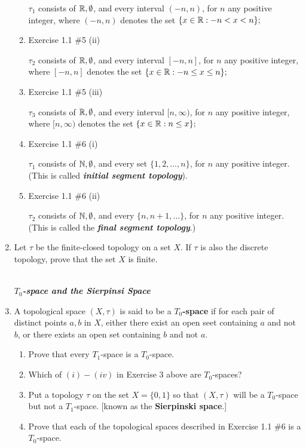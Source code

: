 \documentclass[10pt,a4paper]{report}
\newcommand{\SPECIAL}[1]{\begin{center}
	{\Large \textbf{\textit{\\#1}} }
\end{center}
}
\begin{document}
\begin{enumerate}
\begin{enumerate}[label=(\roman*)]
	$\tau_1$ consists of $\mathbb{R}, \emptyset$, and every interval $(-n,n)$, for $n$ any positive integer, where $(-n,n)$ denotes the set $\{x \in\mathbb{R}:-n<x<n\};$
	
	\item Exercise 1.1 \#5 (ii)
	
	$\tau_2$ consists of $\mathbb{R}, \emptyset$, and every interval $[-n,n]$, for $n$ any positive integer, where $[-n,n]$ denotes the set $\{x \in\mathbb{R}:-n\le x\le n\};$
	
	\item Exercise 1.1 \#5 (iii)
	
	$\tau_3$ consists of $\mathbb{R}, \emptyset$, and every interval $[n,\infty)$, for $n$ any positive integer, where $[n,\infty)$ denotes the set $\{x \in\mathbb{R}:n\le x\};$
	
	\item Exercise 1.1 \#6 (i)
	
	$\tau_1$ consists of $\mathbb{N}, \emptyset$, and every set $\{1,2,\dots,n\}$, for $n$ any positive integer. (This is called \textbf{\textit{initial segment topology}}).
	
	\item Exercise 1.1 \#6 (ii)
	
	$\tau_2$ consists of $\mathbb{N},\emptyset$, and every $\{n, n+1, \dots\}$, for $n$ any positive integer. (This is called the \textbf{\textit{final segment topology}}.)
	
\end{enumerate}

\item Let $\tau$ be the finite-closed topology on a set $X$.  If $\tau$ is also the discrete topology, prove that the set $X$ is finite.

\SPECIAL{$T_0$-space and the Sierpinsi Space}

\item A topological space $(X,\tau)$ is said to be a \textbf{$T_0$-space} if for each pair of distinct points $a,b$ in $X$, either there exist an open seet containing $a$ and not $b$, or there exists an open set containing $b$ and not $a$.

\begin{enumerate}[label=(\roman*)]
	\item Prove that every $T_1$-space is a $T_0$-space.
	\item Which of $(i)-(iv)$ in Exercise 3 above are $T_0$-spaces?
	\item Put a topology $\tau$ on the set $X=\{0,1\}$ so that $(X,\tau)$ will be a $T_0$-space but not a $T_1$-space. [known as the \textbf{Sierpinski space}.]
	\item Prove that each of the topological spaces described in Exercise 1.1 \#6 is a $T_0$-space.
\end{enumerate}


\end{enumerate}
\end{document}
